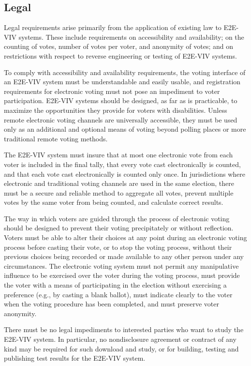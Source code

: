 \subsection{Legal}

Legal requirements arise primarily from the application of existing
law to E2E-VIV systems. These include requirements on accessibility
and availability; on the counting of votes, number of votes per voter,
and anonymity of votes; and on restrictions with respect to reverse
engineering or testing of E2E-VIV systems.

To comply with accessibility and availability requirements, the voting
interface of an E2E-VIV system must be understandable and easily
usable, and registration requirements for electronic voting must not
pose an impediment to voter participation. E2E-VIV systems should be
designed, as far as is practicable, to maximize the opportunities they
provide for voters with disabilities. Unless remote electronic voting
channels are universally accessible, they must be used only as an
additional and optional means of voting beyond polling places or more
traditional remote voting methods.

The E2E-VIV system must insure that at most one electronic vote from
each voter is included in the final tally, that every vote cast
electronically is counted, and that each vote cast electronically is
counted only once. In jurisdictions where electronic and traditional
voting channels are used in the same election, there must be a secure
and reliable method to aggregate all votes, prevent multiple votes by
the same voter from being counted, and calculate correct results.

The way in which voters are guided through the process of electronic
voting should be designed to prevent their voting precipitately or
without reflection. Voters must be able to alter their choices at any
point during an electronic voting process before casting their vote,
or to stop the voting process, without their previous choices being
recorded or made available to any other person under any
circumstances. The electronic voting system must not permit any
manipulative influence to be exercised over the voter during the
voting process, must provide the voter with a means of participating
in the election without exercising a preference (e.g., by casting a
blank ballot), must indicate clearly to the voter when the voting
procedure has been completed, and must preserve voter anonymity.

There must be no legal impediments to interested parties who want to
study the E2E-VIV system. In particular, no nondisclosure agreement or
contract of any kind may be required for such download and study, or
for building, testing and publishing test results for the E2E-VIV
system.

